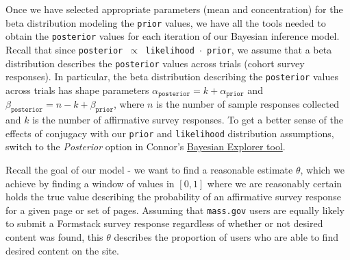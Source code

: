 Once we have selected appropriate parameters (mean and concentration) for the beta distribution modeling the \texttt{prior} values, we have all the tools needed to obtain the \texttt{posterior} values for each iteration of our Bayesian inference model. Recall that since \texttt{posterior $\propto$ likelihood $\cdot$ prior}, we assume that a beta distribution describes the \texttt{posterior} values across trials (cohort survey responses). In particular, the beta distribution describing the \texttt{posterior} values across trials has shape parameters $\alpha_{\texttt{posterior}} = k + \alpha_{\texttt{prior}}$ and $\beta_{\texttt{posterior}} = n - k + \beta_{\texttt{prior}}$, where $n$ is the number of sample responses collected and $k$ is the number of affirmative survey responses. To get a better sense of the effects of conjugacy with our \texttt{prior} and \texttt{likelihood} distribution assumptions, switch to the \textit{Posterior} option in Connor's \href{http://ctmckay.me/bayesian-explorer/}{Bayesian Explorer tool}.

Recall the goal of our model - we want to find a reasonable estimate $\theta$, which we achieve by finding a window of values in $[0,1]$ where we are reasonably certain holds the true value describing the probability of an affirmative survey response for a given page or set of pages. Assuming that \texttt{mass.gov} users are equally likely to submit a Formstack survey response regardless of whether or not desired content was found, this $\theta$ describes the proportion of users who are able to find desired content on the site.